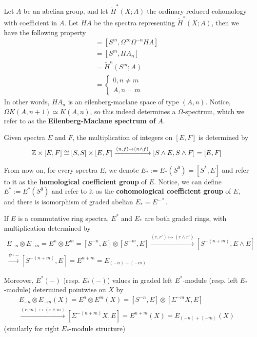 \begin{example}
Let $A$ be an abelian group, and let $\tilde H^*(X;A)$ the ordinary reduced cohomology with coefficient in $A$. Let $HA$ be the spectra representing $\tilde H^*(X;A)$, then we have the following property
\begin{align*}
[\Sigma^{-n} \Sigma ^\infty S^m , HA]=[S^m, \Omega^\infty \Omega^{-n} HA]
\\=[S^m, HA_n]
\\= \tilde H^n(S^m;A)
\\= \begin{cases}
0, n\neq m
\\ A, n=m
\end{cases}
\end{align*}In other words, $HA_n$ is an eilenberg-maclane space of type $(A, n)$. Notice, $\Omega K(A, n+1)\simeq K(A,n)$, so this indeed determines a $\Omega$-spectrum, which we refer to as the \textbf{Eilenberg-Maclane spectrum of} $A$.
\end{example}

Given spectra $E$ and $F$, the multiplication of integers on $[E,F]$ is determined by 
\begin{align*}
\mathbb{Z}\times [E, F]\cong [S, S]\times [E, F]\xrightarrow{(n, f)\mapsto (n\wedge f)} [S\wedge E,S\wedge F]=[E, F]
\end{align*}

\begin{remark}
    From now on, for every spectra $E$, we denote $E_*:=E_*(S^0)=[S^*, E]$ and refer to it as the \textbf{homological coefficient group} of $E$. Notice, we can define $E^*:=E^*(S^0)$ and refer to it as the \textbf{cohomological coefficient group} of $E$, and there is isomorphism of graded abelian $E_*=E^{-*}$.

    If $E$ is a commutative ring spectra, $E^*$ and $E_*$ are both graded rings, with multiplication determined by 
    \begin{align*}
        E_{-n}\otimes E_{-m}=E^n\otimes E^m=[S^{-n}, E]\otimes [S^{-m}, E]\xrightarrow{(r, r')\mapsto (r\wedge r')}[S^{-(n+m)}, E\wedge E]
        \\ \xrightarrow{\psi\circ -} [S^{-(n+m)}, E]=E^{n+m}=E_{(-n)+(-m)}
    \end{align*}

    Moreover, $E^*(-)$ (resp. $E_*(-)$) values in graded left $E^*$-module (resp. left $E_*$-module) determined pointwise on $X$ by
    \begin{align*}
       E_{-n}\otimes E_{-m}(X)= E^n\otimes E^m(X)=[S^{-n}, E]\otimes [\Sigma^{-m}X, E]
       \\ \xrightarrow{(r, m)\mapsto (r\wedge m)}[\Sigma^{-(n+m)}X, E]=E^{n+m}(X)=E_{(-n)+(-m)}(X)
    \end{align*}(similarly for right $E_*$-module structure)
\end{remark}




